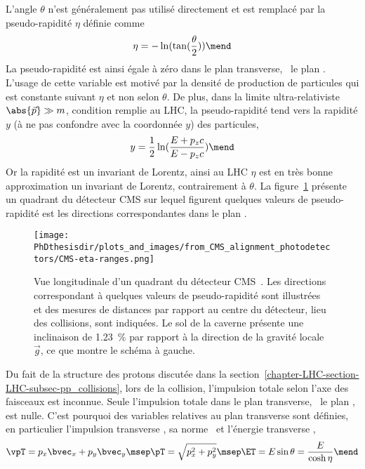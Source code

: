 \par L'angle $\theta$ n'est généralement pas utilisé directement et est remplacé par la \og pseudo-rapidité \fg{} $\eta$ définie comme
\begin{equation}
\eta = - \ln(\tan(\frac{\theta}{2}))
\mend
\label{eq-chapter-LHC-section-CMS-subsec-overview_and_coordinates-eta_definition}
\end{equation}
La pseudo-rapidité est ainsi égale à zéro dans le plan transverse, \ie\ le plan .
L'usage de cette variable est motivé par la densité de production de particules qui est constante suivant $\eta$ et non selon $\theta$.
De plus, dans la limite \og ultra-relativiste \fg{} \ie\ $\abs{\vec{p}}\gg m$, condition remplie au LHC, la pseudo-rapidité tend vers la rapidité $y$ (à ne pas confondre avec la coordonnée $y$) des particules,
\begin{equation}
y = \frac{1}{2} \ln(\frac{E+p_zc}{E-p_zc})
\mend
\end{equation}
Or la rapidité est un invariant de Lorentz, ainsi au LHC $\eta$ est en très bonne approximation un invariant de Lorentz, contrairement à $\theta$.
La figure~\ref{fig-chapter-LHC-section-CMS-subsec-overview_and_coordinates-CMS-eta-ranges} présente un quadrant du détecteur CMS sur lequel figurent quelques valeurs de pseudo-rapidité est les directions correspondantes dans le plan .
\begin{figure}[h]
\centering
\texttt{[image: \\PhDthesisdir/plots\_and\_images/from\_CMS\_alignment\_photodetectors/CMS-eta-ranges.png]}
\caption[Vue longitudinale d'un quadrant du détecteur CMS.]{Vue longitudinale d'un quadrant du détecteur CMS~\cite{CMS_alignment_photodetectors}. Les directions correspondant à quelques valeurs de pseudo-rapidité sont illustrées et des mesures de distances par rapport au centre du détecteur, lieu des collisions, sont indiquées. Le sol de la caverne présente une inclinaison de \SI{1.23}{\%} par rapport à la direction de la gravité locale $\vec{g}$, ce que montre le schéma à gauche.}
\label{fig-chapter-LHC-section-CMS-subsec-overview_and_coordinates-CMS-eta-ranges}
\end{figure}
\par Du fait de la structure des protons discutée dans la section~\ref{chapter-LHC-section-LHC-subsec-pp_collisions}, lors de la collision, l'impulsion totale selon l'axe des faisceaux est inconnue.
Seule l'impulsion totale dans le plan transverse, \ie\ le plan , est nulle.
C'est pourquoi des variables relatives au plan transverse sont définies, en particulier l'impulsion transverse \vpT, sa norme \pT\ et l'énergie transverse \ET,
\begin{equation}
\vpT = p_x\bvec_x + p_y\bvec_y
\msep
\pT = \sqrt{p_x^2+p_y^2}
\msep
\ET = E\sin\theta = \frac{E}{\cosh\eta}
\mend
\end{equation}